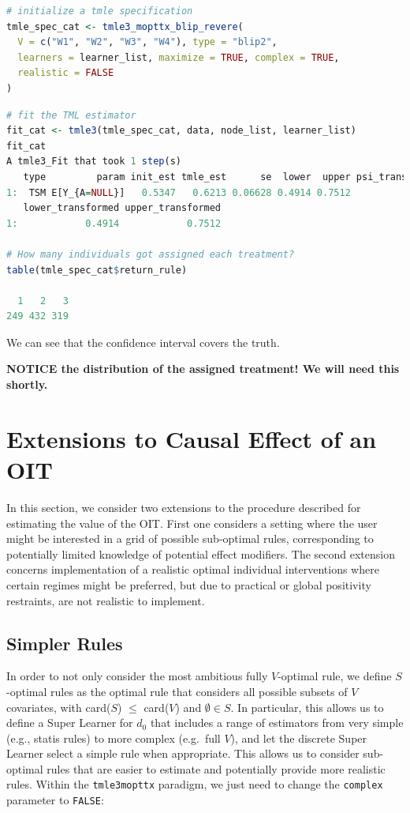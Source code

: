 \documentclass[
  12pt, krantz2,
]{krantz}
\newcommand{\passthrough}[1]{#1}
\newcommand{\1}{\mathbbm{1}}
\theoremstyle{definition}
\theoremstyle{definition}
\theoremstyle{definition}
\theoremstyle{definition}
\theoremstyle{remark}
\begin{document}
\begin{lstlisting}[language=R]
# initialize a tmle specification
tmle_spec_cat <- tmle3_mopttx_blip_revere(
  V = c("W1", "W2", "W3", "W4"), type = "blip2",
  learners = learner_list, maximize = TRUE, complex = TRUE,
  realistic = FALSE
)
\end{lstlisting}

\begin{lstlisting}[language=R]
# fit the TML estimator
fit_cat <- tmle3(tmle_spec_cat, data, node_list, learner_list)
fit_cat
A tmle3_Fit that took 1 step(s)
   type         param init_est tmle_est      se  lower  upper psi_transformed
1:  TSM E[Y_{A=NULL}]   0.5347   0.6213 0.06628 0.4914 0.7512          0.6213
   lower_transformed upper_transformed
1:            0.4914            0.7512

# How many individuals got assigned each treatment?
table(tmle_spec_cat$return_rule)

  1   2   3 
249 432 319 
\end{lstlisting}

We can see that the confidence interval covers the truth.

\textbf{NOTICE the distribution of the assigned treatment! We will need this shortly.}

\hypertarget{extensions-to-causal-effect-of-an-oit}{%
\section{Extensions to Causal Effect of an OIT}\label{extensions-to-causal-effect-of-an-oit}}

In this section, we consider two extensions to the procedure described for
estimating the value of the OIT. First one considers a setting where the user
might be interested in a grid of possible sub-optimal rules, corresponding to
potentially limited knowledge of potential effect modifiers. The second
extension concerns implementation of a realistic optimal individual
interventions where certain regimes might be preferred, but due to practical or
global positivity restraints, are not realistic to implement.

\hypertarget{oit-eval-cat-v2}{%
\subsection{Simpler Rules}\label{oit-eval-cat-v2}}

In order to not only consider the most ambitious fully \(V\)-optimal rule, we
define \(S\)-optimal rules as the optimal rule that considers all possible subsets
of \(V\) covariates, with card(\(S\)) \(\leq\) card(\(V\)) and \(\emptyset \in S\). In
particular, this allows us to define a Super Learner for \(d_0\) that includes
a range of estimators from very simple (e.g., statis rules) to more complex
(e.g.~full \(V\)), and let the discrete Super Learner select a simple rule when
appropriate. This allows us to consider sub-optimal rules that are easier to estimate and
potentially provide more realistic rules. Within the \passthrough{\lstinline!tmle3mopttx!} paradigm, we just need
to change the \passthrough{\lstinline!complex!} parameter to \passthrough{\lstinline!FALSE!}:
\end{document}
